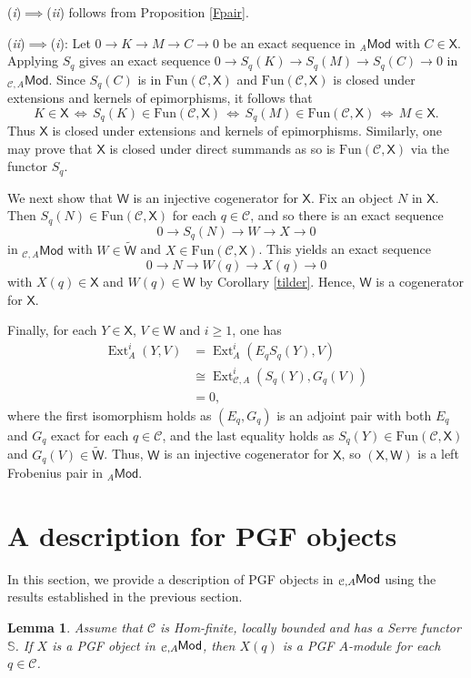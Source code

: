 \documentclass{amsart}
\theoremstyle{bfupright head,slanted body}
\theoremstyle{bfupright head,upright body}
\theoremstyle{fixed bf head,slanted body}
\newtheorem{lem}[res]{Lemma}            \newtheorem*{lem*}{Lemma}
\theoremstyle{fixed bf head,upright body}
\theoremstyle{numbered paragraph}
\newcounter{eqc}
\newenvironment{prf*}[1][Proof]{%
	\begin{proof}[\bf #1]
		\setcounter{equation}{0}
		\renewcommand{\theequation}{\arabic{equation}}}
	{\end{proof}
}
\newcommand{\eqclbl}[1]{{\upshape(\textit{#1})}}
\newcommand{\proofofimp}[3][:]{\mbox{\eqclbl{#2}$\!\implies\!$\eqclbl{#3}#1}}
\numberwithin{equation}{res}
\newcommand{\Mod}[1]{{_{#1}\mathsf{Mod}}}
\newcommand{\Ext}[4][]{\operatorname{Ext}_{#1}^{#2}(#3,#4)}
\newcommand{\Fun}{\mathrm{Fun}}
\newcommand{\X}{\mathsf{X}}
\newcommand{\W}{\mathsf{W}}
\newcommand{\C}{\mathcal{C}}
\newcommand{\lMod}[1]{{}_{#1}\mspace{-1mu}{\sf{Mod}}}
\begin{document}
\begin{prf*}
\eqclbl{i}$\implies$\eqclbl{ii} follows from Proposition \ref{Fpair}.

\proofofimp{ii}{i} Let $0 \to K \to M \to C \to 0$ be an exact sequence in $\Mod{A}$ with $C\in\X$. Applying $S_q$ gives an exact sequence
$0 \to S_q(K) \to S_q(M) \to S_q(C) \to 0$ in $\Mod{\C,A}$.
Since $S_q(C)$ is in $\Fun(\C,\X)$ and $\Fun(\C,\X)$ is closed under extensions and kernels of epimorphisms, it follows that
\[
K \in \X \, \Leftrightarrow \, S_q(K) \in \Fun(\C,\X) \, \Leftrightarrow \, S_q(M) \in \Fun(\C,\X) \, \Leftrightarrow \, M \in \X.
\]
Thus $\X$ is closed under extensions and kernels of epimorphisms. Similarly, one may prove that $\X$ is closed under direct summands as so is $\Fun(\C,\X)$ via the functor $S_q$.

We next show that $\W$ is an injective cogenerator for $\X$.
Fix an object $N$ in $\X$. Then $S_q(N)\in \Fun(\C,\X)$ for each $q\in\C$, and so there is an exact sequence
$$0 \to S_q(N) \to W \to X \to 0$$
in $\Mod{\C,A}$ with $W\in\widetilde{\W}$ and $X\in\Fun(\C,\X)$. This yields an exact sequence
$$0 \to N \to W(q) \to X(q) \to 0$$
with $X(q)\in\X$ and $W(q)\in\W$ by Corollary \ref{tilder}. Hence, $\W$ is a cogenerator for $\X$.

Finally, for each $Y\in\X$, $V\in\W$ and $i\geqslant1$, one has
\begin{align*}
\Ext[A]{i}{Y}{V}&=\Ext[A]{i}{E_qS_q(Y)}{V}\\
&\cong\Ext[\C,A]{i}{S_q(Y)}{G_q(V)}\\
&=0,
\end{align*}
where the first isomorphism holds as $(E_q, G_q)$ is an adjoint pair with both $E_q$ and $G_q$ exact for each $q\in\C$, and the last equality holds as $S_q(Y)\in\Fun(\C,\X)$ and $G_q(V)\in\widetilde{\W}$. Thus, $\W$ is an injective cogenerator for $\X$, so $(\X,\W)$ is a left Frobenius pair in $\Mod{A}$.
\end{prf*}

\section{A description for PGF objects}
\noindent
In this section, we provide a description of PGF objects in $\lMod{\C,A}$ using the results established in the previous section.

\begin{lem}\label{containment}
Assume that $\C$ is Hom-finite, locally bounded and has a Serre functor $\mathbb{S}$. If $X$ is a PGF object in $\lMod{\C,A}$, then $X(q)$ is a PGF $A$-module for each $q\in\C$.
\end{lem}
\end{document}
